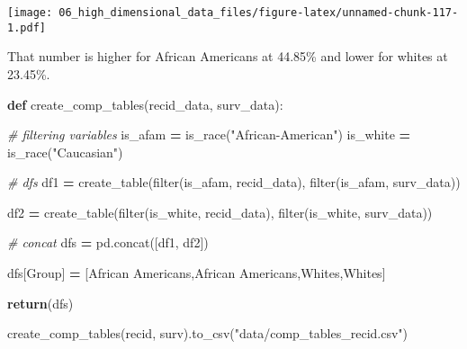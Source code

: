 \documentclass[
]{book}
\newenvironment{Shaded}{\begin{snugshade}}{\end{snugshade}}
\newcommand{\BuiltInTok}[1]{#1}
\newcommand{\CommentTok}[1]{\textcolor[rgb]{0.56,0.35,0.01}{\textit{#1}}}
\newcommand{\ControlFlowTok}[1]{\textcolor[rgb]{0.13,0.29,0.53}{\textbf{#1}}}
\newcommand{\KeywordTok}[1]{\textcolor[rgb]{0.13,0.29,0.53}{\textbf{#1}}}
\newcommand{\NormalTok}[1]{#1}
\newcommand{\OperatorTok}[1]{\textcolor[rgb]{0.81,0.36,0.00}{\textbf{#1}}}
\newcommand{\StringTok}[1]{\textcolor[rgb]{0.31,0.60,0.02}{#1}}
\begin{document}
\texttt{[image: 06\_high\_dimensional\_data\_files/figure-latex/unnamed-chunk-117-1.pdf]}

That number is higher for African Americans at 44.85\% and lower for whites at 23.45\%.

\begin{Shaded}
\begin{Highlighting}[]

\KeywordTok{def}\NormalTok{ create\_comp\_tables(recid\_data, surv\_data):}
  
    \CommentTok{\# filtering variables }
\NormalTok{    is\_afam }\OperatorTok{=}\NormalTok{ is\_race(}\StringTok{"African{-}American"}\NormalTok{)}
\NormalTok{    is\_white }\OperatorTok{=}\NormalTok{ is\_race(}\StringTok{"Caucasian"}\NormalTok{)}
  
    \CommentTok{\# dfs }
\NormalTok{    df1 }\OperatorTok{=}\NormalTok{ create\_table(}\BuiltInTok{filter}\NormalTok{(is\_afam, recid\_data),}
                       \BuiltInTok{filter}\NormalTok{(is\_afam, surv\_data))}
  
\NormalTok{    df2 }\OperatorTok{=}\NormalTok{ create\_table(}\BuiltInTok{filter}\NormalTok{(is\_white, recid\_data), }
                       \BuiltInTok{filter}\NormalTok{(is\_white, surv\_data))}
  
    \CommentTok{\# concat }
\NormalTok{    dfs }\OperatorTok{=}\NormalTok{ pd.concat([df1, df2])}
    
\NormalTok{    dfs[}\StringTok{\textquotesingle{}Group\textquotesingle{}}\NormalTok{] }\OperatorTok{=}\NormalTok{ [}\StringTok{\textquotesingle{}African Americans\textquotesingle{}}\NormalTok{,}\StringTok{\textquotesingle{}African Americans\textquotesingle{}}\NormalTok{,}\StringTok{\textquotesingle{}Whites\textquotesingle{}}\NormalTok{,}\StringTok{\textquotesingle{}Whites\textquotesingle{}}\NormalTok{]}
    
    \ControlFlowTok{return}\NormalTok{(dfs)}
    
\end{Highlighting}
\end{Shaded}

\begin{Shaded}
\begin{Highlighting}[]

\NormalTok{create\_comp\_tables(recid, surv).to\_csv(}\StringTok{"data/comp\_tables\_recid.csv"}\NormalTok{)}
\end{Highlighting}
\end{Shaded}
\end{document}
